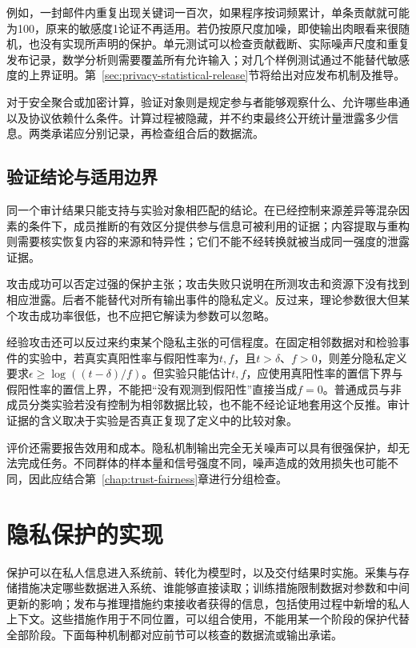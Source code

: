 例如，一封邮件内重复出现关键词一百次，如果程序按词频累计，单条贡献就可能为100，原来的敏感度1论证不再适用。若仍按原尺度加噪，即使输出肉眼看来很随机，也没有实现所声明的保护。单元测试可以检查贡献截断、实际噪声尺度和重复发布记录，数学分析则需要覆盖所有允许输入；对几个样例测试通过不能替代敏感度的上界证明。第~\ref{sec:privacy-statistical-release}节将给出对应发布机制及推导。

对于安全聚合或加密计算，验证对象则是规定参与者能够观察什么、允许哪些串通以及协议依赖什么条件。计算过程被隐藏，并不约束最终公开统计量泄露多少信息。两类承诺应分别记录，再检查组合后的数据流。

\subsection{验证结论与适用边界}
\label{sec:privacy-verification-evidence}

同一个审计结果只能支持与实验对象相匹配的结论。在已经控制来源差异等混杂因素的条件下，成员推断的有效区分提供参与信息可被利用的证据；内容提取与重构则需要核实恢复内容的来源和特异性；它们不能不经转换就被当成同一强度的泄露证据。

攻击成功可以否定过强的保护主张；攻击失败只说明在所测攻击和资源下没有找到相应泄露。后者不能替代对所有输出事件的隐私定义。反过来，理论参数很大但某个攻击成功率很低，也不应把它解读为参数可以忽略。

经验攻击还可以反过来约束某个隐私主张的可信程度。在固定相邻数据对和检验事件的实验中，若真实真阳性率与假阳性率为$t,f$，且$t>\delta$、$f>0$，则差分隐私定义要求$\epsilon\geq\log((t-\delta)/f)$。但实验只能估计$t,f$，应使用真阳性率的置信下界与假阳性率的置信上界，不能把“没有观测到假阳性”直接当成$f=0$。普通成员与非成员分类实验若没有控制为相邻数据比较，也不能不经论证地套用这个反推。审计证据的含义取决于实验是否真正复现了定义中的比较对象。

评价还需要报告效用和成本。隐私机制输出完全无关噪声可以具有很强保护，却无法完成任务。不同群体的样本量和信号强度不同，噪声造成的效用损失也可能不同，因此应结合第~\ref{chap:trust-fairness}章进行分组检查。

\section{隐私保护的实现}
\label{sec:privacy-use}

保护可以在私人信息进入系统前、转化为模型时，以及交付结果时实施。采集与存储措施决定哪些数据进入系统、谁能够直接读取；训练措施限制数据对参数和中间更新的影响；发布与推理措施约束接收者获得的信息，包括使用过程中新增的私人上下文。这些措施作用于不同位置，可以组合使用，不能用某一个阶段的保护代替全部阶段。下面每种机制都对应前节可以核查的数据流或输出承诺。

